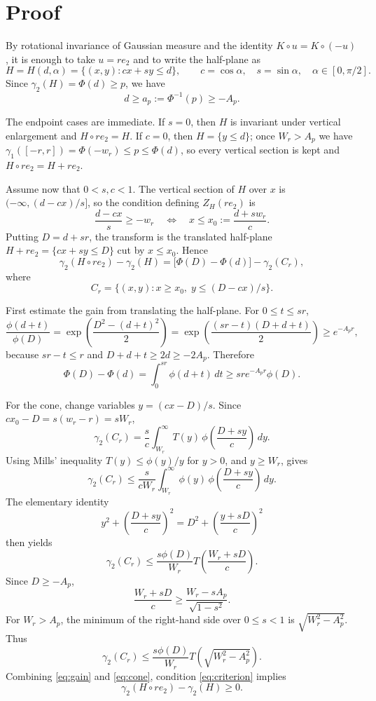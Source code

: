 \documentclass[11pt]{article}
\newcommand{\dd}{\,d}
\begin{document}
\section*{Proof}

By rotational invariance of Gaussian measure and the identity
$K\circ u=K\circ(-u)$, it is enough to take $u=r e_2$ and to write the
half-plane as
\[
  H=H(d,\alpha)=\{(x,y): c x+s y\leq d\},
  \qquad c=\cos\alpha,\quad s=\sin\alpha,\quad
  \alpha\in[0,\pi/2].
\]
Since $\gamma_2(H)=\Phi(d)\geq p$, we have
\[
  d\geq a_p:=\Phi^{-1}(p)\geq -A_p.
\]

The endpoint cases are immediate.  If $s=0$, then $H$ is invariant under
vertical enlargement and $H\circ r e_2=H$.  If $c=0$, then
$H=\{y\leq d\}$; once $W_r>A_p$ we have
$\gamma_1([-r,r])=\Phi(-w_r)\leq p\leq \Phi(d)$, so every vertical section is
kept and $H\circ r e_2=H+r e_2$.

Assume now that $0<s,c<1$.  The vertical section of $H$ over $x$ is
$(-\infty,(d-cx)/s]$, so the condition defining $Z_H(r e_2)$ is
\[
  \frac{d-cx}{s}\geq -w_r
  \quad\Longleftrightarrow\quad
  x\leq x_0:=\frac{d+s w_r}{c}.
\]
Putting $D=d+s r$, the transform is the translated half-plane
$H+r e_2=\{cx+sy\leq D\}$ cut by $x\leq x_0$.  Hence
\[
  \gamma_2(H\circ r e_2)-\gamma_2(H)
  =\bigl[\Phi(D)-\Phi(d)\bigr]-\gamma_2(C_r),
\]
where
\[
  C_r=\{(x,y):x\geq x_0,\; y\leq (D-cx)/s\}.
\]

First estimate the gain from translating the half-plane.  For
$0\leq t\leq sr$,
\[
  \frac{\phi(d+t)}{\phi(D)}
  =\exp\!\left(\frac{D^2-(d+t)^2}{2}\right)
  =\exp\!\left(\frac{(sr-t)(D+d+t)}{2}\right)
  \geq e^{-A_p r},
\]
because $sr-t\leq r$ and $D+d+t\geq 2d\geq -2A_p$.  Therefore
\[
  \Phi(D)-\Phi(d)
  =\int_0^{sr}\phi(d+t)\dd t
  \geq s r e^{-A_p r}\phi(D).
  \tag{2}\label{eq:gain}
\]

For the cone, change variables $y=(cx-D)/s$.  Since
$cx_0-D=s(w_r-r)=sW_r$,
\[
  \gamma_2(C_r)
  =\frac{s}{c}\int_{W_r}^{\infty}
       T(y)\,\phi\!\left(\frac{D+s y}{c}\right)\dd y .
\]
Using Mills' inequality $T(y)\leq \phi(y)/y$ for $y>0$, and $y\geq W_r$, gives
\[
  \gamma_2(C_r)
  \leq \frac{s}{cW_r}\int_{W_r}^{\infty}
       \phi(y)\,\phi\!\left(\frac{D+s y}{c}\right)\dd y .
\]
The elementary identity
\[
  y^2+\left(\frac{D+s y}{c}\right)^2
  =D^2+\left(\frac{y+sD}{c}\right)^2
\]
then yields
\[
  \gamma_2(C_r)
  \leq
  \frac{s\phi(D)}{W_r}
  T\!\left(\frac{W_r+sD}{c}\right).
  \tag{3}\label{eq:cone-pre}
\]
Since $D\geq -A_p$,
\[
  \frac{W_r+sD}{c}
  \geq
  \frac{W_r-sA_p}{\sqrt{1-s^2}}.
\]
For $W_r>A_p$, the minimum of the right-hand side over $0\leq s<1$ is
$\sqrt{W_r^2-A_p^2}$.  Thus
\[
  \gamma_2(C_r)
  \leq
  \frac{s\phi(D)}{W_r}
  T\!\left(\sqrt{W_r^2-A_p^2}\right).
  \tag{4}\label{eq:cone}
\]
Combining \eqref{eq:gain} and \eqref{eq:cone}, condition
\eqref{eq:criterion} implies
\[
  \gamma_2(H\circ r e_2)-\gamma_2(H)\geq 0.
\]
\end{document}
